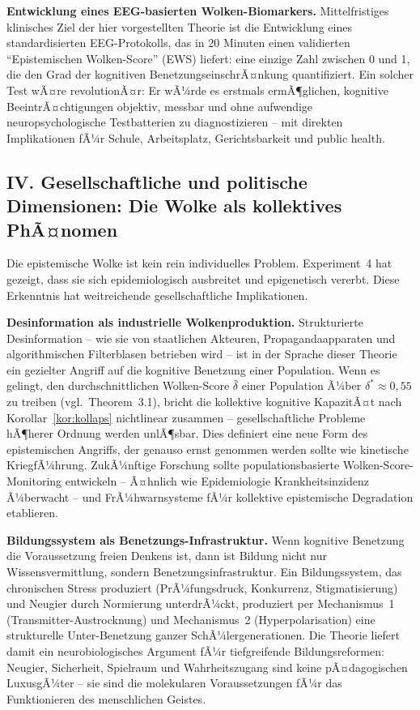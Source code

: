 ﻿\documentclass[12pt,a4paper]{report}
\theoremstyle{plain}
\theoremstyle{definition}
\theoremstyle{remark}
\begin{document}
	\textbf{Entwicklung eines EEG-basierten Wolken-Biomarkers.}
	Mittelfristiges klinisches Ziel der hier vorgestellten Theorie
	ist die Entwicklung eines standardisierten EEG-Proto\-kolls,
	das in 20 Minuten einen validierten ``Epistemischen Wolken-Score''
	(EWS) liefert: eine einzige Zahl zwischen 0 und 1,
	die den Grad der kognitiven BenetzungseinschrÃ¤nkung quantifiziert.
	Ein solcher Test wÃ¤re revolutionÃ¤r: Er wÃ¼rde es erstmals ermÃ¶glichen,
	kognitive BeeintrÃ¤chtigungen objektiv, messbar und ohne aufwendige
	neuropsychologische Testbatterien zu diagnostizieren --
	mit direkten Implikationen fÃ¼r Schule, Arbeitsplatz, Gerichtsbarkeit
	und public health.

	\subsection*{IV. Gesellschaftliche und politische Dimensionen:
		Die Wolke als kollektives PhÃ¤nomen}

	Die epistemische Wolke ist kein rein individuelles Problem.
	Experiment~4 hat gezeigt, dass sie sich epidemiologisch ausbreitet
	und epigenetisch vererbt. Diese Erkenntnis hat weitreichende
	gesellschaftliche Implikationen.

	\textbf{Desinformation als industrielle Wolkenproduktion.}
	Strukturierte Desinformation -- wie sie von staatlichen Akteuren,
	Propagandaapparaten und algorithmischen Filterblasen betrieben wird --
	ist in der Sprache dieser Theorie ein gezielter Angriff auf die
	kognitive Benetzung einer Population.
	Wenn es gelingt, den durchschnittlichen Wolken-Score $\bar{\delta}$
	einer Population Ã¼ber $\delta^* \approx 0{,}55$ zu treiben
	(vgl.\ Theorem~3.1), bricht die kollektive kognitive KapazitÃ¤t
	nach Korollar~\ref{kor:kollaps} nichtlinear zusammen --
	gesellschaftliche Probleme hÃ¶herer Ordnung werden unlÃ¶sbar.
	Dies definiert eine neue Form des epistemischen Angriffs,
	der genauso ernst genommen werden sollte wie kinetische KriegfÃ¼hrung.
	ZukÃ¼nftige Forschung sollte populationsbasierte Wolken-Score-Monitoring
	entwickeln -- Ã¤hnlich wie Epidemiologie Krankheitsinzidenz Ã¼berwacht --
	und FrÃ¼hwarnsysteme fÃ¼r kollektive epistemische Degradation etablieren.

	\textbf{Bildungssystem als Benetzungs-Infrastruktur.}
	Wenn kognitive Benetzung die Voraussetzung freien Denkens ist,
	dann ist Bildung nicht nur Wissensvermittlung,
	sondern Benetzungsinfrastruktur.
	Ein Bildungssystem, das chronischen Stress produziert
	(PrÃ¼fungsdruck, Konkurrenz, Stigmatisierung)
	und Neugier durch Normierung unterdrÃ¼ckt,
	produziert per Mechanismus~1 (Transmitter-Austrocknung)
	und Mechanismus~2 (Hyperpolarisation) eine strukturelle
	Unter-Benetzung ganzer SchÃ¼lergenerationen.
	Die Theorie liefert damit ein neurobiologisches Argument
	fÃ¼r tiefgreifende Bildungsreformen:
	Neugier, Sicherheit, Spielraum und Wahrheitszugang sind keine
	pÃ¤dagogischen LuxusgÃ¼ter -- sie sind die molekularen Voraussetzungen
	fÃ¼r das Funktionieren des menschlichen Geistes.
\end{document}
